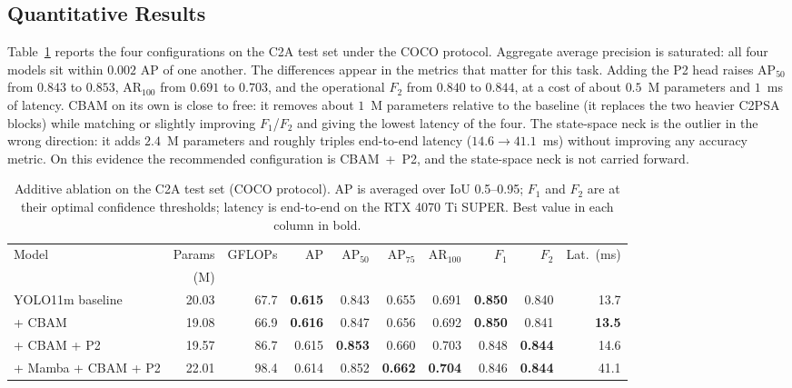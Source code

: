\subsection{Quantitative Results}
Table~\ref{tab:main} reports the four configurations on the C2A test set under the
COCO protocol. Aggregate average precision is saturated: all four models sit within
$0.002$ AP of one another. The differences appear in the metrics that matter for
this task. Adding the P2 head raises $\mathrm{AP}_{50}$ from $0.843$ to $0.853$,
$\mathrm{AR}_{100}$ from $0.691$ to $0.703$, and the operational $F_2$ from
$0.840$ to $0.844$, at a cost of about $0.5$~M parameters and $1$~ms of latency.
CBAM on its own is close to free: it removes about $1$~M parameters relative to the
baseline (it replaces the two heavier C2PSA blocks) while matching or slightly
improving $F_1$/$F_2$ and giving the lowest latency of the four. The state-space
neck is the outlier in the wrong direction: it adds $2.4$~M parameters and roughly
triples end-to-end latency ($14.6 \to 41.1$~ms) without improving any accuracy
metric. On this evidence the recommended configuration is CBAM~+~P2, and the
state-space neck is not carried forward.

\begin{table}[tbp]
  \centering
  \caption{Additive ablation on the C2A test set (COCO protocol). AP is averaged
  over IoU 0.5--0.95; $F_1$ and $F_2$ are at their optimal confidence thresholds;
  latency is end-to-end on the RTX 4070 Ti SUPER. Best value in each column in bold.}
  \label{tab:main}
  \setlength{\tabcolsep}{4pt}
  \begin{tabular}{@{}l r r r r r r r r r@{}}
    \toprule
    Model & Params & GFLOPs & AP & $\mathrm{AP}_{50}$ & $\mathrm{AP}_{75}$ & $\mathrm{AR}_{100}$ & $F_1$ & $F_2$ & Lat.\ (ms) \\
    & (M) & & & & & & & & \\
    \midrule
    YOLO11m baseline    & 20.03 & 67.7 & \textbf{0.615} & 0.843 & 0.655 & 0.691 & \textbf{0.850} & 0.840 & 13.7 \\
    + CBAM              & 19.08 & 66.9 & \textbf{0.616} & 0.847 & 0.656 & 0.692 & \textbf{0.850} & 0.841 & \textbf{13.5} \\
    + CBAM + P2         & 19.57 & 86.7 & 0.615 & \textbf{0.853} & 0.660 & 0.703 & 0.848 & \textbf{0.844} & 14.6 \\
    + Mamba + CBAM + P2 & 22.01 & 98.4 & 0.614 & 0.852 & \textbf{0.662} & \textbf{0.704} & 0.846 & \textbf{0.844} & 41.1 \\
    \bottomrule
  \end{tabular}
\end{table}

